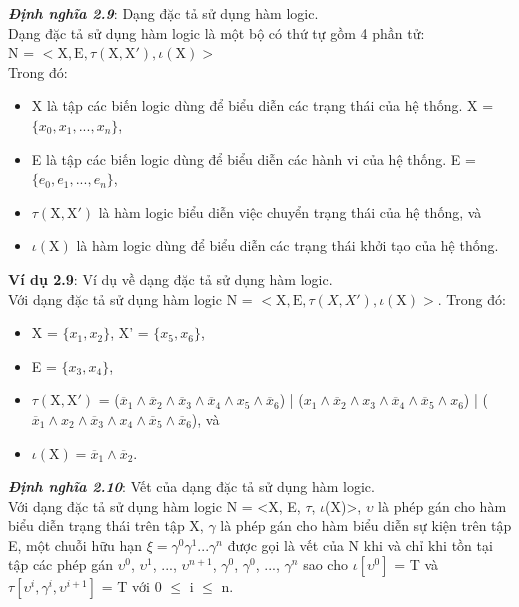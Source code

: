 \documentclass[a4paper,13pt,oneside,openany]{book}
\begin{document}
\begin{flushleft}
		\textbf{\textit{Định nghĩa 2.9}}: Dạng đặc tả sử dụng hàm logic.\\
		Dạng đặc tả sử dụng hàm logic là một bộ có thứ tự gồm 4 phần tử:\\
		N = $<\textrm{X}, \textrm{E}, \tau(\textrm{X}, \textrm{X}'), \iota(\textrm{X})>$\\
		Trong đó:\\
		\begin{itemize}
			\item X là tập các biến logic dùng để biểu diễn các trạng thái của hệ thống. X = $\{x_0, x_1, ..., x_n\}$,
			\item E là tập các biến logic dùng để biểu diễn các hành vi của hệ thống. E = $\{e_0, e_1, ..., e_n\}$,
			\item $\tau(\textrm{X}, \textrm{X}')$ là hàm logic biểu diễn việc chuyển trạng thái của hệ thống, và
			\item $\iota(\textrm{X})$ là hàm logic dùng để biểu diễn các trạng thái khởi tạo của hệ thống.
		\end{itemize}
		\textbf{Ví dụ 2.9}: Ví dụ về dạng đặc tả sử dụng hàm logic.\\
		Với dạng đặc tả sử dụng hàm logic N = $<\textrm{X}, \textrm{E}, \tau(X, X'), \iota(\textrm{X})>$. Trong đó:\\
		\begin{itemize}
			\item X = $\{x_1, x_2\}$, X' = $\{x_5, x_6\}$,
			\item E = $\{x_3, x_4\}$,
			\item $\tau(\textrm{X}, \textrm{X}')$ = ($\overline{x}_1 \land \overline{x}_2 \land \overline{x}_3 \land \overline{x}_4 \land x_5 \land \overline{x}_6$) | ($x_1\land\overline{x}_2\land x_3\land \overline{x}_4\land \overline{x}_5 \land x_6$) |
			($\overline{x}_1\land x_2\land\overline{x}_3\land x_4\land \overline{x}_5\land\overline{x}_6$), và
			\item $\iota(\textrm{X}) = \overline{x}_1 \land \overline{x}_2$.
		\end{itemize}
		\textbf{\textit{Định nghĩa 2.10}}: Vết của dạng đặc tả sử dụng hàm logic.\\
		Với dạng đặc tả sử dụng hàm logic N = <X, E, $\tau$, $\iota$(X)>, $\upsilon$ là phép gán cho hàm biểu diễn trạng thái trên tập X, $\gamma$ là phép gán cho hàm biểu diễn sự kiện trên tập E, một chuỗi hữu hạn $\xi = \gamma^0\gamma^1...\gamma^n$ được gọi là vết của N khi và chỉ khi tồn tại tập các phép gán $\upsilon^0$, $\upsilon^1$, ..., $\upsilon^{n+1}$, $\gamma^0$, $\gamma^0$, ..., $\gamma^n$ sao cho $\iota[\upsilon^0]$ = T và $\tau[\upsilon^i, \gamma^i, \upsilon^{i+1}]$ = T với 0 $\leq$ i $\leq$ n.\\

\end{flushleft}
\end{document}
